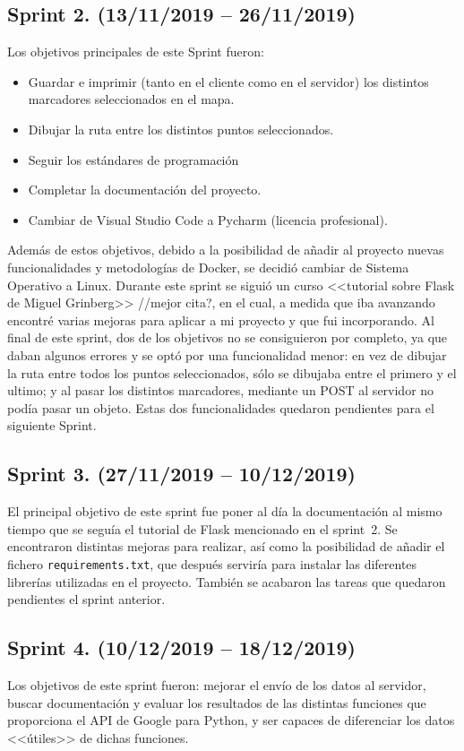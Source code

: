 \subsection{Sprint 2. (13/11/2019 -- 26/11/2019)}
Los objetivos principales de este Sprint fueron: 
\begin{itemize}
	\item Guardar e imprimir (tanto en el cliente como en el servidor) los distintos marcadores seleccionados en el mapa.
	\item Dibujar la ruta entre los distintos puntos seleccionados.
	\item Seguir los estándares de programación
	\item Completar la documentación del proyecto.
	\item Cambiar de Visual Studio Code a Pycharm (licencia profesional).
\end{itemize}
Además de estos objetivos, debido a la posibilidad de añadir al proyecto nuevas funcionalidades y metodologías de Docker, se decidió cambiar de Sistema Operativo a Linux.
Durante este sprint se siguió un curso <<tutorial sobre Flask de Miguel Grinberg>> //mejor cita?, en el cual, a medida que iba avanzando encontré varias mejoras para aplicar a mi proyecto y que fui incorporando.
Al final de este sprint, dos de los objetivos no se consiguieron por completo, ya que daban algunos errores y se optó por una funcionalidad menor: en vez de dibujar la ruta entre todos los puntos seleccionados, sólo se dibujaba entre el primero y el ultimo; y al pasar los distintos marcadores, mediante un POST al servidor no podía pasar un objeto. Estas dos funcionalidades quedaron pendientes para el siguiente Sprint.

\subsection{Sprint 3. (27/11/2019 -- 10/12/2019)}
El principal objetivo de este sprint fue poner al día la documentación al mismo tiempo que se seguía el tutorial de Flask mencionado en el sprint~2.
Se encontraron distintas mejoras para realizar, así como la posibilidad de añadir el fichero \texttt{requirements.txt}, que después serviría para instalar las diferentes librerías utilizadas en el proyecto.
También se acabaron las tareas que quedaron pendientes el sprint anterior.

\subsection{Sprint 4. (10/12/2019 -- 18/12/2019)}
Los objetivos de este sprint fueron: mejorar el envío de los datos al servidor, buscar documentación y evaluar los resultados de las distintas funciones que proporciona el API de Google para Python, y ser capaces de diferenciar los datos <<útiles>> de dichas funciones.

